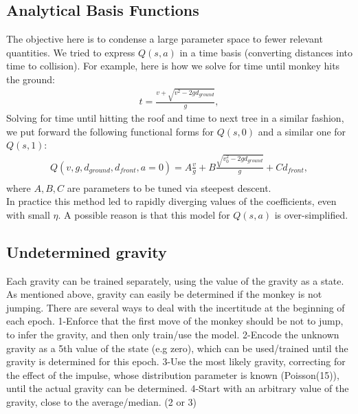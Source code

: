 \documentclass[11pt]{article}
\begin{document}
\subsection{Analytical Basis Functions} 
The objective here is to condense a large parameter space to fewer relevant quantities. We tried to express $Q(s,a)$ in a time basis (converting distances into time to collision). For example, here is how we solve for time until monkey hits the ground:
\begin{gather}
t = \frac{v+\sqrt{v^2-2gd_{ground}}}{g},
\end{gather}
Solving for time until hitting the roof and time to next tree in a similar fashion, we put forward the following functional forms for $Q(s,0)$ and a similar one for $Q(s,1)$:
\begin{gather}
Q(v, g, d_{ground},d_{front}, a= 0) = A\frac{v}{g}+B\frac{\sqrt{v_0^2-2gd_{ground}}}{g}+Cd_{front},\\
\end{gather}
where $A,B,C$ are parameters to be tuned via steepest descent. %
\\In practice this method led to rapidly diverging values of the coefficients, even with small $\eta$. A possible reason is that this model for $Q(s,a)$ is over-simplified.
\subsection{Undetermined gravity
}
Each gravity can be trained separately, using the value of the gravity as a state. As mentioned above, gravity can easily be determined if the monkey is not jumping. There are several ways to deal with the incertitude at the beginning of each epoch.
1-Enforce that the first move of the monkey should be not to jump, to infer the gravity, and then only train/use the model. 
2-Encode the unknown gravity as a 5th value of the state (e.g zero), which can be used/trained until the gravity is determined for this epoch.
3-Use the most likely gravity, correcting for the effect of the impulse, whose distribution parameter is known (Poisson(15)), until the actual gravity can be determined.
4-Start with an arbitrary value of the gravity, close to the average/median. (2 or 3)
\end{document}
